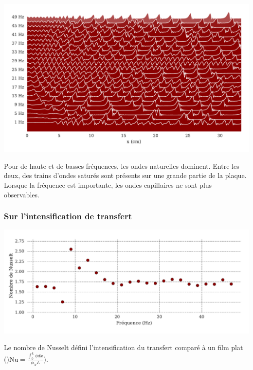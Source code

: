 \documentclass[a0,portrait]{a0poster}
\begin{document}
\begin{multicols}{2}
\begin{multicols}{2}
        \begin{center}
            \includegraphics[width=0.98\columnwidth]{01-frequency_effect}
            \label{fig:freq_effect}
        \end{center}

        Pour de haute et de basses fréquences, les ondes naturelles dominent. Entre les deux, des trains d'ondes saturés sont présents sur une grande partie de la plaque. Lorsque la fréquence est importante, les ondes capillaires ne sont plus observables.

        \columnbreak

        \subsubsection*{Sur l'intensification de transfert}

        \begin{center}
            \includegraphics[width=0.98\columnwidth]{01-Nusselt_freq}
            \label{fig:freq_effect_Nu}
        \end{center}
        Le nombre de Nusselt défini l'intensification du transfert comparé à un film plat ()$\mathrm{Nu} = \frac{\int^L_0 \phi dx}{\phi_N L}$).


\end{multicols}
\end{multicols}
\end{document}
